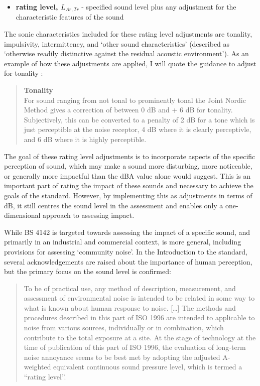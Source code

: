 \begin{itemize}
  \item \textbf{rating level, $L_{Ar,Tr}$} - specified sound level plus any adjustment for the characteristic features of the sound
\end{itemize}

The sonic characteristics included for these rating level adjustments are tonality, impulsivity, intermittency, and `other sound characteristics' (described as `otherwise readily distinctive against the residual acoustic environment'). As an example of how these adjustments are applied, I will quote the guidance to adjust for tonality \citep[pg. 13]{BS41422019}:

\begin{quote}
  \textbf{Tonality} \\
  For sound ranging from not tonal to prominently tonal the Joint Nordic Method \citep{ISO1996Part1} gives a correction of between 0 dB and + 6 dB for tonality. Subjectively, this can be converted to a penalty of 2 dB for a tone which is just perceptible at the noise receptor, 4 dB where it is clearly perceptivle, and 6 dB where it is highly perceptible.
\end{quote}

The goal of these rating level adjustments is to incorporate aspects of the specific perception of sound, which may make a sound more disturbing, more noticeable, or generally more impactful than the dBA value alone would suggest. This is an important part of rating the impact of these sounds and necessary to achieve the goals of the standard. However, by implementing this as adjustments in terms of dB, it still centres the sound level in the assessment and enables only a one-dimensional approach to assessing impact. 

While BS 4142 is targeted towards assessing the impact of a specific sound, and primarily in an industrial and commercial context, \citet{ISO1996Part1} is more general, including provisions for assessing `community noise'. In the Introduction to the standard, several acknowledgements are raised about the importance of human perception, but the primary focus on the sound level is confirmed:

\begin{quote}
  To be of practical use, any method of description, measurement, and assessment of environmental noise is intended to be related in some way to what is known about human response to noise. [\ldots] The methods and procedures described in this part of ISO 1996 are intended to applicable to noise from various sources, individually or in combination, which contribute to the total exposure at a site. At the stage of technology at the time of publication of this part of ISO 1996, the evaluation of long-term noise annoyance seems to be best met by adopting the adjusted A-weighted equivalent continuous sound pressure level, which is termed a ``rating level''. 
\end{quote}

